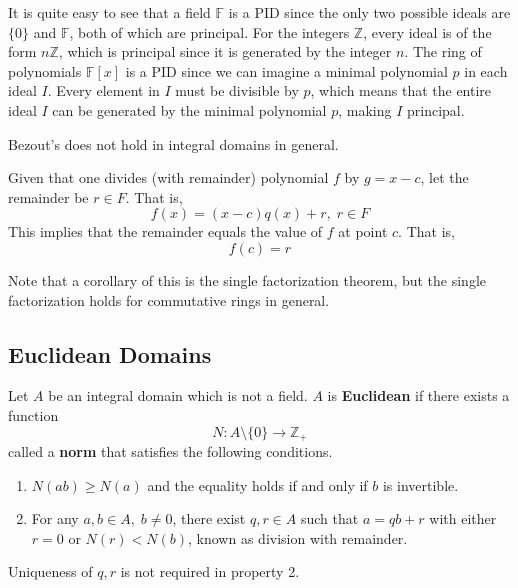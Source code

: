   It is quite easy to see that a field $\mathbb{F}$ is a PID since the only two possible ideals are $\{0\}$ and $\mathbb{F}$, both of which are principal. For the integers $\mathbb{Z}$, every ideal is of the form $n\mathbb{Z}$, which is principal since it is generated by the integer $n$. The ring of polynomials $\mathbb{F}[x]$ is a PID since we can imagine a minimal polynomial $p$ in each ideal $I$. Every element in $I$ must be divisible by $p$, which means that the entire ideal $I$ can be generated by the minimal polynomial $p$, making $I$ principal. 

  Bezout's does not hold in integral domains in general. 

  \begin{theorem}
    Given that one divides (with remainder) polynomial $f$ by $g = x - c$, let the remainder be $r \in F$. That is, 
    \begin{equation}
      f(x) = (x-c) q(x) + r, \; r \in F
    \end{equation}
    This implies that the remainder equals the value of $f$ at point $c$. That is, 
    \begin{equation}
      f(c) = r
    \end{equation}
  \end{theorem} 

  Note that a corollary of this is the single factorization theorem, but the single factorization holds for commutative rings in general. 

\subsection{Euclidean Domains}

  \begin{definition}
    Let $A$ be an integral domain which is not a field. $A$ is \textbf{Euclidean} if there exists a function 
    \begin{equation}
      N: A \setminus \{ 0 \} \longrightarrow \mathbb{Z}_+
    \end{equation}
    called a \textbf{norm} that satisfies the following conditions. 
    \begin{enumerate}
      \item $N(a b) \geq N(a)$ and the equality holds if and only if $b$ is invertible. 
      \item For any $a, b \in A, \; b \neq 0$, there exist $q, r \in A$ such that $a = q b + r$ with either $r = 0$ or $ N(r) < N(b)$, known as division with remainder. 
    \end{enumerate}
    Uniqueness of $q, r$ is not required in property 2. 
  \end{definition}

